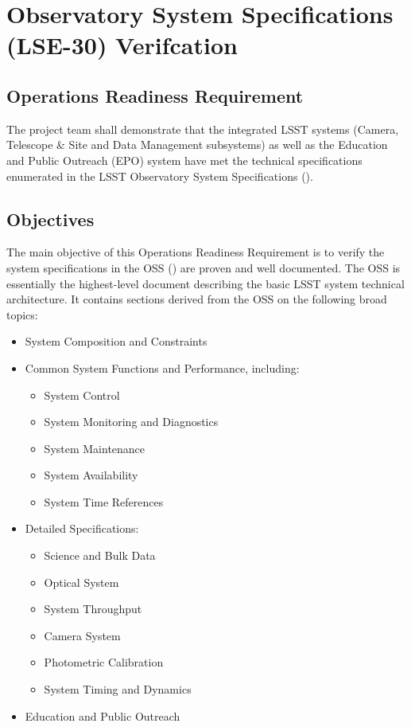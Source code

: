 \section{Observatory System Specifications (LSE-30) Verifcation}  \label{sec:oss}

\subsection{Operations Readiness Requirement}
The project team shall demonstrate that the integrated LSST systems (Camera, Telescope \& Site and Data Management subsystems) as well as the Education and Public Outreach (EPO) system have met the technical specifications enumerated in the LSST Observatory System Specifications ().

\subsection{Objectives}

The main objective of this Operations Readiness Requirement is to verify the system specifications in the OSS () are proven and well documented.  The OSS is essentially the highest-level document describing the basic LSST system technical architecture.  It contains sections derived from the OSS on the following broad topics:

\begin{itemize}
\item System Composition and Constraints

\item Common System Functions and Performance, including:

	\begin{itemize}
		\item System Control
		\item System Monitoring and Diagnostics
		\item System Maintenance
		\item System Availability
		\item System Time References
	\end{itemize}

\item Detailed Specifications:

	\begin{itemize}
		\item Science and Bulk Data
		\item Optical System
		\item System Throughput
		\item Camera System
		\item Photometric Calibration
		\item System Timing and Dynamics
	\end{itemize}
	
\item Education and Public Outreach

\end{itemize}


